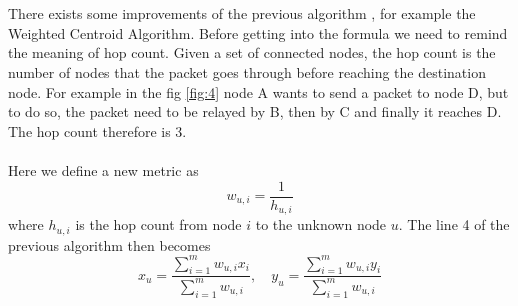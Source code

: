 \documentclass[12pt]{report}
\begin{document}
\\\\There exists some improvements of the previous algorithm \cite{KAUR201982}, for example the Weighted Centroid Algorithm. Before getting into the formula we need to remind the meaning of hop count. Given a set of connected nodes, the hop count is the number of nodes that the packet goes through before reaching the destination node. For example in the fig \ref{fig:4} node A wants to send a packet to node D, but to do so, the packet need to be relayed by B, then by C and finally it reaches D. The hop count therefore is 3.\\\\
Here we define a new metric as 
\begin{equation}
    w_{u,i}=\frac{1}{h_{u,i}}
\end{equation}
where $h_{u,i}$ is the hop count from node $i$ to the unknown node $u$. The line 4 of the previous algorithm then becomes
\begin{equation}
     x_u=\frac{\sum_{i=1}^mw_{u,i}x_i}{\sum_{i=1}^mw_{u,i}},\quad y_u=\frac{\sum_{i=1}^mw_{u,i}y_i}{\sum_{i=1}^mw_{u,i}}
\end{equation}








\clearpage
\end{document}
